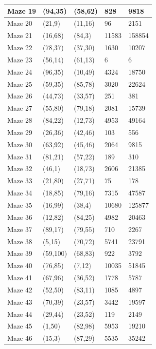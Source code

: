 \documentclass{article}
\begin{document}
\begin{table}
{\begin{tabular}{||p{1.5cm}|p{1.5cm}|p{1.5cm}|p{3.5cm}|p{3.5cm}||}
 \hline
 Maze 19 & (94,35) & (58,62) & 828 & 9818\\ 
 \hline
 Maze 20 & (21,9) & (11,16) & 96 & 2151\\
 \hline
 Maze 21 & (16,68) & (84,3) & 11583 & 158854\\
 \hline
 Maze 22 & (78,37) & (37,30) & 1630 & 10207\\
 \hline
 Maze 23 & (56,14) & (61,13) & 6 & 6\\
 \hline
 Maze 24 & (96,35) & (10,49) & 4324 & 18750\\ 
 \hline
 Maze 25 & (59,35) & (85,78) & 3020 & 22624\\
 \hline
  Maze 26 & (44,73) & (33,57) & 251 & 381\\
 \hline
 Maze 27 & (55,80) & (79,18) & 2081& 15739 \\
 \hline
 Maze 28 & (84,22) & (12,73) & 4953 & 49164 \\
 \hline
 Maze 29 & (26,36) & (42,46) & 103 & 556 \\
 \hline
 Maze 30 & (63,92) & (45,46) & 2064 & 9815 \\
 \hline
 Maze 31 & (81,21) & (57,22) & 189 & 310\\ 
 \hline
 Maze 32 & (46,1) & (18,73) & 2606 & 21385\\
 \hline
 Maze 33 & (21,80) & (27,71) & 75 & 178 \\
 \hline
 Maze 34 & (18,85) & (79,16) & 7315 & 47587\\
 \hline
 Maze 35 & (16,99) & (38,4) & 10680 & 125877 \\
 \hline
 Maze 36 & (12,82) & (84,25) & 4982 & 20463\\ 
 \hline
 Maze 37 & (89,17) & (79,55) & 710 & 2267\\
 \hline
  Maze 38 & (5,15) & (70,72) & 5741 & 23791 \\
 \hline
 Maze 39 & (59,100) & (68,83) & 922 & 3792\\
 \hline
 Maze 40 & (76,85) & (7,12) & 10035 & 51845\\
 \hline
 Maze 41 & (67,96) & (36,52) & 1778 & 5787 \\
 \hline
 Maze 42 & (52,50) & (83,11) & 1085 & 4897 \\
 \hline
 Maze 43 & (70,39) & (23,57) & 3442 & 19597\\ 
 \hline
 Maze 44 & (29,44) & (23,52) & 119 & 2149 \\
 \hline
 Maze 45 & (1,50) & (82,98) & 5953 & 19210 \\
 \hline
 Maze 46 & (15,3) & (87,29) & 5535 & 35242 \\

\end{tabular}}
\end{table}
\end{document}
